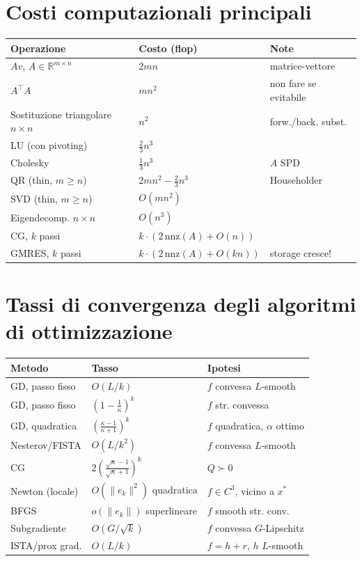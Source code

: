 \documentclass[11pt, a4paper, twoside]{book}
\theoremstyle{definition}
\theoremstyle{plain}
\theoremstyle{remark}
\newcommand{\R}{\mathbb{R}}
\begin{document}
\section{Costi computazionali principali}

\begin{center}
\renewcommand{\arraystretch}{1.3}
\begin{tabular}{lll}
\hline
\textbf{Operazione} & \textbf{Costo (flop)} & \textbf{Note} \\
\hline
$Av$, $A \in \R^{m \times n}$ & $2mn$ & matrice-vettore \\
$A^\top A$ & $mn^2$ & non fare se evitabile \\
Sostituzione triangolare $n \times n$ & $n^2$ & forw./back. subst. \\
LU (con pivoting) & $\frac{2}{3}n^3$ & \\
Cholesky & $\frac{1}{3}n^3$ & $A$ SPD \\
QR (thin, $m \geq n$) & $2mn^2 - \frac{2}{3}n^3$ & Householder \\
SVD (thin, $m \geq n$) & $O(mn^2)$ & \\
Eigendecomp. $n \times n$ & $O(n^3)$ & \\
CG, $k$ passi & $k \cdot (2\,\mathrm{nnz}(A) + O(n))$ & \\
GMRES, $k$ passi & $k \cdot (2\,\mathrm{nnz}(A) + O(kn))$ & storage cresce! \\
\hline
\end{tabular}
\end{center}

\section{Tassi di convergenza degli algoritmi di ottimizzazione}

\begin{center}
\renewcommand{\arraystretch}{1.5}
\begin{tabular}{p{3.5cm}p{4.5cm}p{4cm}}
\hline
\textbf{Metodo} & \textbf{Tasso} & \textbf{Ipotesi} \\
\hline
GD, passo fisso & $O(L/k)$ & $f$ convessa $L$-smooth \\
GD, passo fisso & $\left(1-\frac{1}{\kappa}\right)^k$ & $f$ str. convessa \\
GD, quadratica & $\left(\frac{\kappa-1}{\kappa+1}\right)^k$ & $f$ quadratica, $\alpha$ ottimo \\
Nesterov/FISTA & $O(L/k^2)$ & $f$ convessa $L$-smooth \\
CG & $2\left(\frac{\sqrt{\kappa}-1}{\sqrt{\kappa}+1}\right)^k$ & $Q \succ 0$ \\
Newton (locale) & $O(\|e_k\|^2)$ quadratica & $f \in C^3$, vicino a $x^*$ \\
BFGS & $o(\|e_k\|)$ superlineare & $f$ smooth str. conv. \\
Subgradiente & $O(G/\sqrt{k})$ & $f$ convessa $G$-Lipschitz \\
ISTA/prox grad. & $O(L/k)$ & $f = h + r$, $h$ $L$-smooth \\
\hline
\end{tabular}
\end{center}
\end{document}
